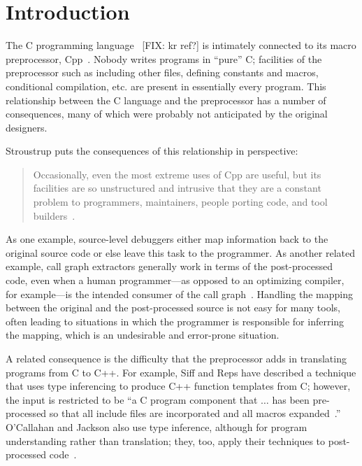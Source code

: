 \bigskip

\section{Introduction}

The C programming language~\cite{kr,ansi} [FIX: kr ref?] is intimately
connected to its macro preprocessor, Cpp~\cite[Ch.3]{Harbison91}.
Nobody writes programs in ``pure'' C; facilities of the preprocessor
such as including other files, defining constants and macros,
conditional compilation, etc. are present in essentially every program.
This relationship between the C language and the preprocessor has a
number of consequences, many of which were probably not anticipated by
the original designers.

Stroustrup puts the consequences of this relationship in perspective:
\begin{quote}
Occasionally, even the most extreme uses of Cpp are useful, but its
facilities are so unstructured and intrusive that they are a constant
problem to programmers, maintainers, people porting code, and tool
builders~\cite[p.~424]{Stroustrup-DesignEvolution}.
\end{quote}

As one example, source-level debuggers either map information back to
the original source code or else leave this task to the programmer.
As another related example, call graph extractors generally work in
terms of the post-processed code, even when a human programmer---as
opposed to an optimizing compiler, for example---is the intended
consumer of the call graph~\cite{Murphy-icse18}.  Handling the mapping
between the original and the post-processed source is not easy for many
tools, often leading to situations in which the programmer is
responsible for inferring the mapping, which is an
undesirable and error-prone situation.

A related consequence is the difficulty that the preprocessor adds in
translating programs from C to C++.  For example, Siff and Reps have
described a technique that uses type inferencing to produce C++
function templates from C; however, the input is restricted to be ``a
C program component that $\ldots$ has been pre-processed so that all
include files are incorporated and all macros
expanded~\cite[p.~145]{Siff-fse96}.''  O'Callahan and Jackson also use
type inference, although for program understanding rather than
translation; they, too, apply their techniques to post-processed
code~\cite{OCallahan-icse97}.  

